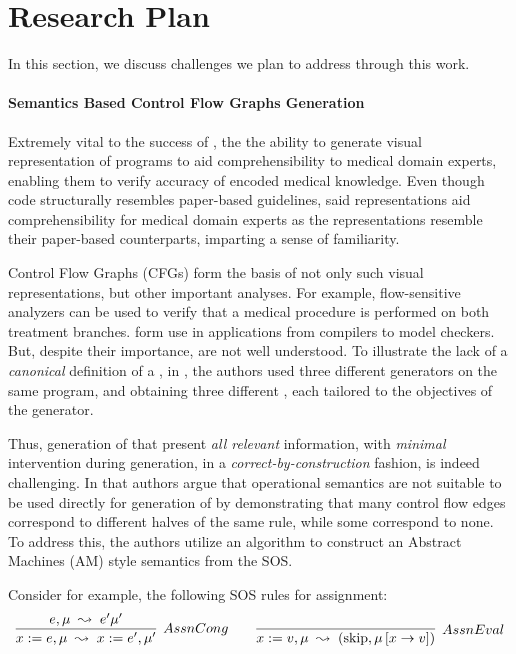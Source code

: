\section{Research Plan}

In this section, we discuss challenges we plan to address through this work.

\paragraph{Semantics Based Control Flow Graphs Generation}

Extremely vital to the success of \MediK{}, the the ability
to generate visual representation of \MediK{} programs to aid
comprehensibility to medical domain experts, enabling them to verify
accuracy of encoded medical knowledge. Even though \MediK{} code
structurally resembles paper-based guidelines, said
representations aid comprehensibility for medical
domain experts as the representations resemble their paper-based counterparts,
imparting a sense of familiarity.

Control Flow Graphs (CFGs) form the basis of not only such visual
representations, but other important analyses. For example,
flow-sensitive analyzers can be used to verify that a medical procedure
is performed on both treatment branches.
\CGSs{} form use in applications from compilers to model checkers.
But, despite their importance, \CGSs{} are not well understood.
To illustrate the lack of a \emph{canonical} definition of a \CGS{},
in \cite{KoppelICFP22}, the authors
used three different \CFG{} generators
on the same program, and obtaining three different \CFGs{}, each
tailored to the objectives of the generator.

Thus, generation of \CFGs{} that present \emph{all relevant} information,
with \emph{minimal} intervention during generation, in a
\emph{correct-by-construction} fashion, is indeed challenging.
In \cite{KoppelICFP22} that authors argue that operational semantics
are not suitable to be used directly for generation of \CFGs{} by demonstrating
that many control flow edges correspond to different halves of the same rule,
while some correspond to none. To address this, the authors utilize an algorithm
to construct an Abstract Machines (AM) style semantics from the SOS.

Consider for example, the following SOS rules for assignment:
$$
\infer[AssnCong]
{x := e, \mu\; \leadsto\; x := e^{\prime}, \mu^{\prime}}{e, \mu\; \leadsto\; e^{\prime}\mu^{\prime}}
\quad \quad
\infer[AssnEval]
{x := v,\mu\; \leadsto\; \left(\text{skip}, \mu\left[x \rightarrow v\right]\right)}{}
$$

